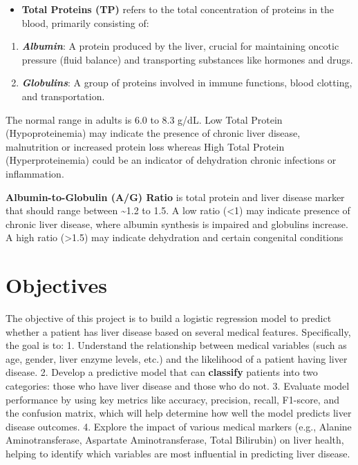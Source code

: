 \documentclass[11pt]{article}
\providecommand{\tightlist}{%
      \setlength{\itemsep}{0pt}\setlength{\parskip}{0pt}}
\begin{document}
\begin{itemize}
\tightlist
\item
  \textbf{Total Proteins (TP)} refers to the total concentration of
  proteins in the blood, primarily consisting of:
\end{itemize}

\begin{enumerate}
\def\labelenumi{\arabic{enumi}.}
\tightlist
\item
  \textbf{\emph{Albumin}}: A protein produced by the liver, crucial for
  maintaining oncotic pressure (fluid balance) and transporting
  substances like hormones and drugs.
\item
  \textbf{\emph{Globulins}}: A group of proteins involved in immune
  functions, blood clotting, and transportation.
\end{enumerate}

The normal range in adults is 6.0 to 8.3 g/dL. Low Total Protein
(Hypoproteinemia) may indicate the presence of chronic liver disease,
malnutrition or increased protein loss whereas High Total Protein
(Hyperproteinemia) could be an indicator of dehydration chronic
infections or inflammation.

\textbf{Albumin-to-Globulin (A/G) Ratio} is total protein and liver
disease marker that should range between \textasciitilde1.2 to 1.5. A
low ratio (\textless1) may indicate presence of chronic liver disease,
where albumin synthesis is impaired and globulins increase. A high ratio
(\textgreater1.5) may indicate dehydration and certain congenital
conditions

    \section{Objectives}\label{objectives}

The objective of this project is to build a logistic regression model to
predict whether a patient has liver disease based on several medical
features. Specifically, the goal is to: 1. Understand the relationship
between medical variables (such as age, gender, liver enzyme levels,
etc.) and the likelihood of a patient having liver disease. 2. Develop a
predictive model that can \textbf{classify} patients into two
categories: those who have liver disease and those who do not. 3.
Evaluate model performance by using key metrics like accuracy,
precision, recall, F1-score, and the confusion matrix, which will help
determine how well the model predicts liver disease outcomes. 4. Explore
the impact of various medical markers (e.g., Alanine Aminotransferase,
Aspartate Aminotransferase, Total Bilirubin) on liver health, helping to
identify which variables are most influential in predicting liver
disease.
\end{document}
